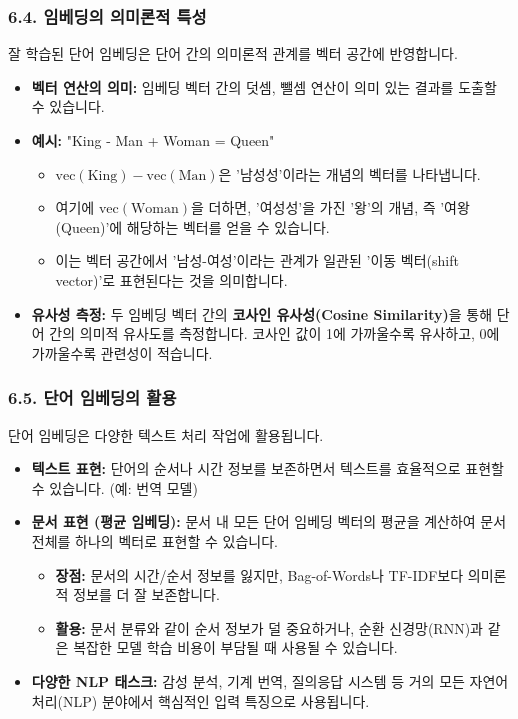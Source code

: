 \documentclass[11pt,a4paper]{article}
\theoremstyle{definition}
\begin{document}
\subsubsection{6.4. 임베딩의 의미론적 특성}
잘 학습된 단어 임베딩은 단어 간의 의미론적 관계를 벡터 공간에 반영합니다.

\begin{itemize}
    \item \textbf{벡터 연산의 의미:} 임베딩 벡터 간의 덧셈, 뺄셈 연산이 의미 있는 결과를 도출할 수 있습니다.
    \item \textbf{예시:} "King - Man + Woman = Queen"
        \begin{itemize}
            \item $\text{vec}(\text{King}) - \text{vec}(\text{Man})$은 '남성성'이라는 개념의 벡터를 나타냅니다.
            \item 여기에 $\text{vec}(\text{Woman})$을 더하면, '여성성'을 가진 '왕'의 개념, 즉 '여왕(Queen)'에 해당하는 벡터를 얻을 수 있습니다.
            \item 이는 벡터 공간에서 '남성-여성'이라는 관계가 일관된 '이동 벡터(shift vector)'로 표현된다는 것을 의미합니다.
        \end{itemize}
    \item \textbf{유사성 측정:} 두 임베딩 벡터 간의 \textbf{코사인 유사성(Cosine Similarity)}을 통해 단어 간의 의미적 유사도를 측정합니다. 코사인 값이 1에 가까울수록 유사하고, 0에 가까울수록 관련성이 적습니다.
\end{itemize}

\subsubsection{6.5. 단어 임베딩의 활용}
단어 임베딩은 다양한 텍스트 처리 작업에 활용됩니다.

\begin{itemize}
    \item \textbf{텍스트 표현:} 단어의 순서나 시간 정보를 보존하면서 텍스트를 효율적으로 표현할 수 있습니다. (예: 번역 모델)
    \item \textbf{문서 표현 (평균 임베딩):} 문서 내 모든 단어 임베딩 벡터의 평균을 계산하여 문서 전체를 하나의 벡터로 표현할 수 있습니다.
        \begin{itemize}
            \item \textbf{장점:} 문서의 시간/순서 정보를 잃지만, Bag-of-Words나 TF-IDF보다 의미론적 정보를 더 잘 보존합니다.
            \item \textbf{활용:} 문서 분류와 같이 순서 정보가 덜 중요하거나, 순환 신경망(RNN)과 같은 복잡한 모델 학습 비용이 부담될 때 사용될 수 있습니다.
        \end{itemize}
    \item \textbf{다양한 NLP 태스크:} 감성 분석, 기계 번역, 질의응답 시스템 등 거의 모든 자연어 처리(NLP) 분야에서 핵심적인 입력 특징으로 사용됩니다.
\end{itemize}
\end{document}
